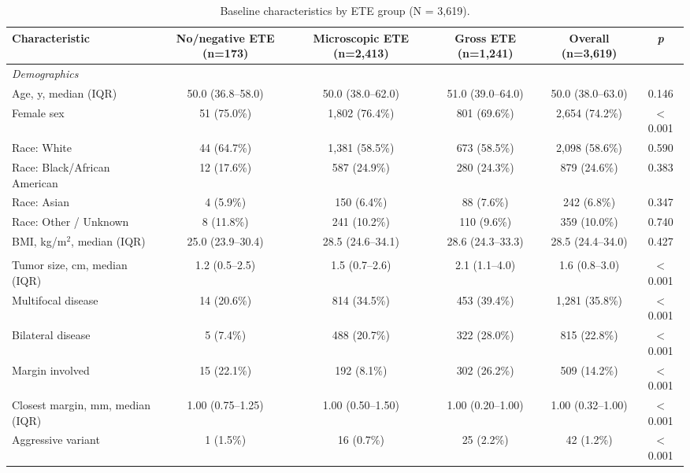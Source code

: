 \begin{landscape}
\begin{table}[htbp]
\centering
\scriptsize
\caption{Baseline characteristics by ETE group (N = 3{,}619).}
\label{tab:baseline}
\begin{threeparttable}
\begin{tabular}{@{}lccccc@{}}
\toprule
\textbf{Characteristic} & \textbf{No/negative ETE (n=173)} & \textbf{Microscopic ETE (n=2{,}413)} & \textbf{Gross ETE (n=1{,}241)} & \textbf{Overall (n=3{,}619)} & \textbf{\textit{p}} \\
\midrule
\multicolumn{6}{l}{\textit{Demographics}} \\
\quad Age, y, median (IQR) & 50.0 (36.8--58.0) & 50.0 (38.0--62.0) & 51.0 (39.0--64.0) & 50.0 (38.0--63.0) & 0.146 \\
\quad Female sex & 51 (75.0\%) & 1{,}802 (76.4\%) & 801 (69.6\%) & 2{,}654 (74.2\%) & $<$0.001 \\
\quad Race: White & 44 (64.7\%) & 1{,}381 (58.5\%) & 673 (58.5\%) & 2{,}098 (58.6\%) & 0.590 \\
\quad Race: Black/African American & 12 (17.6\%) & 587 (24.9\%) & 280 (24.3\%) & 879 (24.6\%) & 0.383 \\
\quad Race: Asian & 4 (5.9\%) & 150 (6.4\%) & 88 (7.6\%) & 242 (6.8\%) & 0.347 \\
\quad Race: Other / Unknown & 8 (11.8\%) & 241 (10.2\%) & 110 (9.6\%) & 359 (10.0\%) & 0.740 \\
\quad BMI, kg/m$^2$, median (IQR) & 25.0 (23.9--30.4) & 28.5 (24.6--34.1) & 28.6 (24.3--33.3) & 28.5 (24.4--34.0) & 0.427 \\
\addlinespace
\multicolumn{6}{l}{\textit{Tumor characteristics}} \\
\quad Tumor size, cm, median (IQR) & 1.2 (0.5--2.5) & 1.5 (0.7--2.6) & 2.1 (1.1--4.0) & 1.6 (0.8--3.0) & $<$0.001 \\
\quad Multifocal disease & 14 (20.6\%) & 814 (34.5\%) & 453 (39.4\%) & 1{,}281 (35.8\%) & $<$0.001 \\
\quad Bilateral disease & 5 (7.4\%) & 488 (20.7\%) & 322 (28.0\%) & 815 (22.8\%) & $<$0.001 \\
\quad Margin involved & 15 (22.1\%) & 192 (8.1\%) & 302 (26.2\%) & 509 (14.2\%) & $<$0.001 \\
\quad Closest margin, mm, median (IQR) & 1.00 (0.75--1.25) & 1.00 (0.50--1.50) & 1.00 (0.20--1.00) & 1.00 (0.32--1.00) & $<$0.001 \\
\quad Aggressive variant & 1 (1.5\%) & 16 (0.7\%) & 25 (2.2\%) & 42 (1.2\%) & $<$0.001 \\

\end{tabular}
\end{threeparttable}
\end{table}
\end{landscape}
